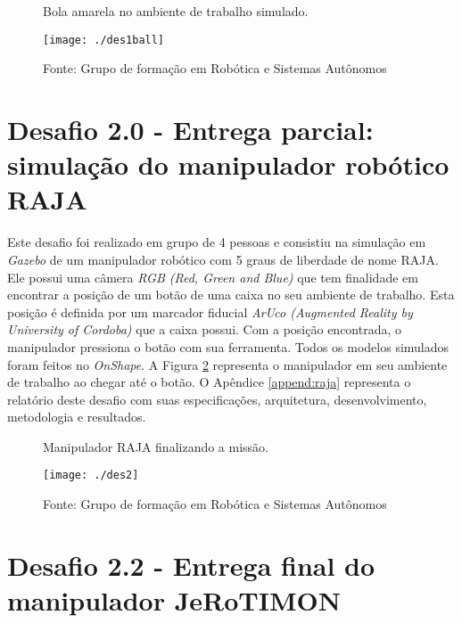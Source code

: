 \begin{figure} [H]												
    \centering
    \caption{Bola amarela no ambiente de trabalho simulado.}												
	\texttt{[image: ./des1ball]}	
	\caption*{Fonte: Grupo de formação em Robótica e Sistemas Autônomos}
	\label{img:des1ball}									 
\end{figure}

\section{Desafio 2.0 - Entrega parcial: simulação do manipulador robótico RAJA}
\label{sec:des2}

Este desafio foi realizado em grupo de 4 pessoas e consistiu na simulação em \textit{Gazebo} de um manipulador robótico com 5 graus de liberdade de nome RAJA. Ele possui uma câmera \textit{RGB (Red, Green and Blue)} que tem finalidade em encontrar a posição de um botão de uma caixa no seu ambiente de trabalho. Esta posição é definida por um marcador fiducial \textit{ArUco (Augmented Reality by University of Cordoba)} que a caixa possui. Com a posição encontrada, o manipulador pressiona o botão com sua ferramenta. Todos os modelos simulados foram feitos no \textit{OnShape}. A Figura \ref{img:des2} representa o manipulador em seu ambiente de trabalho ao chegar até o botão. O Apêndice \ref{append:raja} representa o relatório deste desafio com suas especificações, arquitetura, desenvolvimento, metodologia e resultados.

\begin{figure} [H]												
    \centering
    \caption{Manipulador RAJA finalizando a missão.}	
	\texttt{[image: ./des2]}	
	\caption*{Fonte: Grupo de formação em Robótica e Sistemas Autônomos}
	\label{img:des2}									 
\end{figure}

\section{Desafio 2.2 - Entrega final do manipulador JeRoTIMON}
\label{sec:des22}

